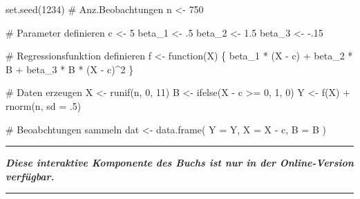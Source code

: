 \documentclass[
  a4paper,
  DIV=11,
  oneside]{scrreprt}
\newenvironment{Shaded}{\begin{snugshade}}{\end{snugshade}}
\newcommand{\AttributeTok}[1]{\textcolor[rgb]{0.40,0.45,0.13}{#1}}
\newcommand{\CommentTok}[1]{\textcolor[rgb]{0.37,0.37,0.37}{#1}}
\newcommand{\ControlFlowTok}[1]{\textcolor[rgb]{0.00,0.23,0.31}{#1}}
\newcommand{\DecValTok}[1]{\textcolor[rgb]{0.68,0.00,0.00}{#1}}
\newcommand{\FloatTok}[1]{\textcolor[rgb]{0.68,0.00,0.00}{#1}}
\newcommand{\FunctionTok}[1]{\textcolor[rgb]{0.28,0.35,0.67}{#1}}
\newcommand{\NormalTok}[1]{\textcolor[rgb]{0.00,0.23,0.31}{#1}}
\newcommand{\OtherTok}[1]{\textcolor[rgb]{0.00,0.23,0.31}{#1}}
\newcommand{\SpecialCharTok}[1]{\textcolor[rgb]{0.37,0.37,0.37}{#1}}
\begin{document}
\begin{Shaded}
\begin{Highlighting}[]
\FunctionTok{set.seed}\NormalTok{(}\DecValTok{1234}\NormalTok{)}
\CommentTok{\# Anz.Beobachtungen}
\NormalTok{n }\OtherTok{\textless{}{-}} \DecValTok{750}

\CommentTok{\# Parameter definieren}
\NormalTok{c }\OtherTok{\textless{}{-}} \DecValTok{5}
\NormalTok{beta\_1 }\OtherTok{\textless{}{-}}\NormalTok{ .}\DecValTok{5}
\NormalTok{beta\_2 }\OtherTok{\textless{}{-}} \FloatTok{1.5}
\NormalTok{beta\_3 }\OtherTok{\textless{}{-}} \SpecialCharTok{{-}}\NormalTok{.}\DecValTok{15}

\CommentTok{\# Regressionsfunktion definieren}
\NormalTok{f }\OtherTok{\textless{}{-}} \ControlFlowTok{function}\NormalTok{(X) \{}
\NormalTok{  beta\_1 }\SpecialCharTok{*}\NormalTok{ (X }\SpecialCharTok{{-}}\NormalTok{ c) }\SpecialCharTok{+}\NormalTok{ beta\_2 }\SpecialCharTok{*}\NormalTok{ B }\SpecialCharTok{+}\NormalTok{ beta\_3 }\SpecialCharTok{*}\NormalTok{ B }\SpecialCharTok{*}\NormalTok{ (X }\SpecialCharTok{{-}}\NormalTok{ c)}\SpecialCharTok{\^{}}\DecValTok{2}
\NormalTok{\}}

\CommentTok{\# Daten erzeugen}
\NormalTok{X }\OtherTok{\textless{}{-}} \FunctionTok{runif}\NormalTok{(n, }\DecValTok{0}\NormalTok{, }\DecValTok{11}\NormalTok{)}
\NormalTok{B }\OtherTok{\textless{}{-}} \FunctionTok{ifelse}\NormalTok{(X }\SpecialCharTok{{-}}\NormalTok{ c }\SpecialCharTok{\textgreater{}=} \DecValTok{0}\NormalTok{, }\DecValTok{1}\NormalTok{, }\DecValTok{0}\NormalTok{)}
\NormalTok{Y }\OtherTok{\textless{}{-}} \FunctionTok{f}\NormalTok{(X) }\SpecialCharTok{+} \FunctionTok{rnorm}\NormalTok{(n, }\AttributeTok{sd =}\NormalTok{ .}\DecValTok{5}\NormalTok{)}

\CommentTok{\# Beoabchtungen sammeln}
\NormalTok{dat }\OtherTok{\textless{}{-}} \FunctionTok{data.frame}\NormalTok{(}
  \AttributeTok{Y =}\NormalTok{ Y, }\AttributeTok{X =}\NormalTok{ X }\SpecialCharTok{{-}}\NormalTok{ c, }\AttributeTok{B =}\NormalTok{ B}
\NormalTok{)}
\end{Highlighting}
\end{Shaded}

\begin{center}\rule{0.5\linewidth}{0.5pt}\end{center}

\textbf{\emph{Diese interaktive Komponente des Buchs ist nur in der
Online-Version verfügbar.}}

\begin{center}\rule{0.5\linewidth}{0.5pt}\end{center}
\end{document}
